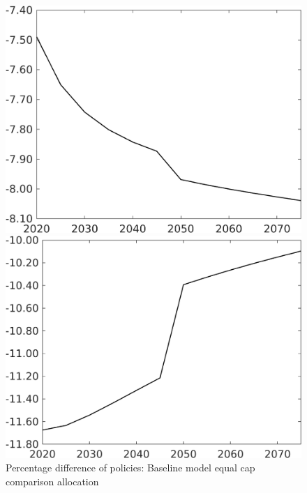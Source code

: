 \documentclass[12pt]{article}
\begin{document}
\begin{figure}[h!!]
	\centering
	\caption{Percentage difference of policies: Baseline model equal cap comparison allocation}\label{fig:Pertauf_nsk0_xgr0_eqaul}
	
	\begin{minipage}[]{0.32\textwidth}
		\includegraphics[width=1\textwidth]{../../codding_model/own_basedOnFried/optimalPol_010922_revision/figures/all_13Sept22/CompTaufPER_bytaul_Equlab_Reg0_N_spillover0_nsk0_xgr0_knspil0_sep1_LFlimit1_emsbase0_countec0_GovRev0_etaa0.79_lgd0.png}
	\end{minipage}	
	\begin{minipage}[]{0.32\textwidth}
		\includegraphics[width=1\textwidth]{../../codding_model/own_basedOnFried/optimalPol_010922_revision/figures/all_13Sept22/CompTaufPER_bytaul_Equlab_Reg0_G_spillover0_nsk0_xgr0_knspil0_sep1_LFlimit1_emsbase0_countec0_GovRev0_etaa0.79_lgd0.png}

\end{minipage}
\end{figure}
\end{document}
